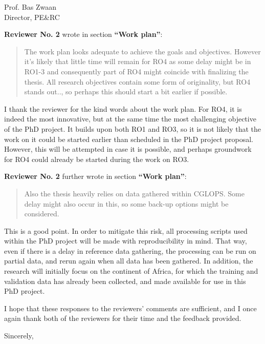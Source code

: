 \documentclass[a4paper,10pt,backaddress=false]{scrartcl}
\begin{document}
\begin{letter}{Prof. Bas Zwaan \\ Director, PE\&RC}
\bigskip

\textbf{Reviewer No. 2} wrote in section \textbf{``Work plan''}:

\blockquote{The work plan looks adequate to achieve the goals and objectives. However it’s likely that little time will remain for RO4 as some delay might be in RO1-3 and consequently part of RO4 might coincide with finalizing the thesis. All research objectives contain some form of originality, but RO4 stands out.., so perhaps this should start a bit earlier if possible.}

I thank the reviewer for the kind words about the work plan. For RO4, it is indeed the most innovative, but at the same time the most challenging objective of the PhD project. It builds upon both RO1 and RO3, so it is not likely that the work on it could be started earlier than scheduled in the PhD project proposal. However, this will be attempted in case it is possible, and perhaps groundwork for RO4 could already be started during the work on RO3.

\bigskip

\textbf{Reviewer No. 2} further wrote in section \textbf{``Work plan''}:

\blockquote{Also the thesis heavily relies on data gathered within CGLOPS. Some delay might also occur in this, so some back-up options might be considered.}

This is a good point. In order to mitigate this risk, all processing scripts used within the PhD project will be made with reproducibility in mind. That way, even if there is a delay in reference data gathering, the processing can be run on partial data, and rerun again when all data has been gathered. In addition, the research will initially focus on the continent of Africa, for which the training and validation data has already been collected, and made available for use in this PhD project.



\bigskip

I hope that these responses to the reviewers' comments are sufficient, and I once again thank both of the reviewers for their time and the feedback provided.

\closing{Sincerely,}

\end{letter}
\end{document}
